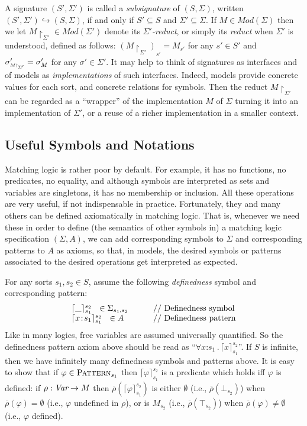 \documentclass[UTF8,11pt]{article}
\theoremstyle{plain}
\theoremstyle{definition}
\theoremstyle{remark}
\newcommand{\cln}{\texttt{:}}
\newcommand{\Mod}{\textit{Mod}}
\newcommand{\reduct}[2]{\mbox{${#1}\!\!\upharpoonright_{#2}$}}
\newcommand{\reductscript}[2]{\mbox{\tiny${#1}\!\!\upharpoonright_{#2}$}}
\newcommand{\Pattern}{\textsc{Pattern}\xspace}
\newcommand{\ra}{\rightarrow}
\begin{document}
A signature $(S',\Sigma')$ is called a \emph{subsignature} of $(S,\Sigma)$, written
$(S',\Sigma') \hookrightarrow(S,\Sigma)$, if and only if $S' \subseteq S$ and
$\Sigma' \subseteq \Sigma$.
If $M \in \Mod(\Sigma)$ then we let
$\reduct{M}{\Sigma'} \in \Mod(\Sigma')$ denote its
\emph{$\Sigma'$-reduct}, or simply its \emph{reduct} when
$\Sigma'$ is understood, defined as follows:
$(\reduct{M}{\Sigma'})_{s'} = M_{s'}$ for any $s'\in S'$ and
$\sigma'_{\reductscript{M}{\Sigma'}} = \sigma'_M$ for any $\sigma'\in\Sigma'$.
It may help to think of signatures as interfaces and of models as
\emph{implementations} of such interfaces.
Indeed, models provide concrete values for each sort, and concrete relations
for symbols.
Then the reduct $\reduct{M}{\Sigma'}$ can be regarded as a ``wrapper'' of
the implementation $M$ of $\Sigma$ turning it into an implementation of
$\Sigma'$, or a reuse of a richer implementation in a smaller context.

\subsection{Useful Symbols and Notations}
\label{sec:useful}

Matching logic is rather poor by default.
For example, it has no functions, no predicates, no equality, and although
symbols are interpreted as sets and variables are singletons, it has no
membership or inclusion.
All these operations are very useful, if not indispensable in practice.
Fortunately, they and many others can be defined axiomatically in matching
logic.
That is, whenever we need these in order to define (the semantics of other
symbols in) a matching logic specification $(\Sigma,A)$, we can add
corresponding symbols to $\Sigma$ and corresponding patterns to $A$ as axioms,
so that, in models, the desired symbols or patterns associated to the
desired operations get interpreted as expected.

For any sorts $s_1,s_2\in S$, assume the following \emph{definedness}
symbol and corresponding pattern:
$$
\begin{array}{l@{\hspace*{7ex}}l}
\lceil\_\rceil_{s_1}^{s_2} \ \ \in \Sigma_{s_1,s_2}
& \textrm{// Definedness symbol} \\
\lceil x\!:\! s_1 \rceil_{s_1}^{s_2} \ \ \in A &
\textrm{// Definedness pattern}
\end{array}
$$
Like in many logics, free variables are assumed universally quantified.
So the definedness pattern axiom above should be read as
``$\forall x\cln s_1\,.\,\lceil x \rceil_{s_1}^{s_2}$''.
If $S$ is infinite, then we have infinitely many definedness symbols and patterns
above.
It is easy to show that if $\varphi \in \Pattern_{s_1}$ then
$\lceil\varphi\rceil_{s_1}^{s_2}$ is a predicate which holds iff $\varphi$ is
defined:
if $\rho : \Var \ra M$ then
$\overline{\rho}(\lceil\varphi\rceil_{s_1}^{s_2})$ is either $\emptyset$
(i.e., $\overline{\rho}(\bot_{s_2})$)
when $\overline{\rho}(\varphi) = \emptyset$
(i.e., $\varphi$ undefined in $\rho$), or is $M_{s_2}$
(i.e., $\overline{\rho}(\top_{s_2})$) 
when $\overline{\rho}(\varphi) \neq \emptyset$ (i.e., $\varphi$ defined).
\end{document}
